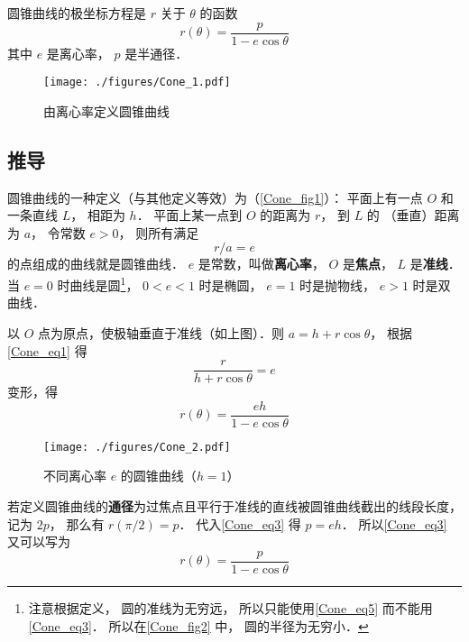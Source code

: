 

圆锥曲线的极坐标方程是 $r$ 关于 $\theta$ 的函数
\begin{equation}\label{Cone_eq5}
r(\theta)  = \frac{p}{1 - e\cos \theta }
\end{equation}
其中 $e$ 是离心率， $p$ 是半通径．

\begin{figure}[ht]
\centering
\texttt{[image: ./figures/Cone\_1.pdf]}
\caption{由离心率定义圆锥曲线}\label{Cone_fig1}
\end{figure}

\subsection{推导}
圆锥曲线的一种定义（与其他定义等效）为（\autoref{Cone_fig1}）：
平面上有一点 $O$ 和一条直线 $L$， 相距为 $h$． 
平面上某一点到 $O$ 的距离为 $r$， 到 $L$ 的
（垂直）距离为 $a$， 令常数 $e > 0$， 则所有满足
\begin{equation}\label{Cone_eq1}
r/a = e
\end{equation}
的点组成的曲线就是圆锥曲线． $e$ 是常数，叫做\textbf{离心率}， $O$ 是\textbf{焦点}， $L$ 是\textbf{准线}． 当 $e = 0$ 时曲线是圆\footnote{注意根据定义， 圆的准线为无穷远， 所以只能使用\autoref{Cone_eq5} 而不能用\autoref{Cone_eq3}． 所以在\autoref{Cone_fig2} 中， 圆的半径为无穷小．}， $0 < e < 1$ 时是椭圆， $e = 1$ 时是抛物线， $e > 1$ 时是双曲线．

以 $O$ 点为原点，使极轴垂直于准线（如上图）．则 $a = h + r \cos \theta $， 根据\autoref{Cone_eq1} 得
\begin{equation}\label{Cone_eq2}
\frac{r}{h + r \cos \theta } = e
\end{equation}
变形，得
\begin{equation}\label{Cone_eq3}
r(\theta) = \frac{eh}{1 - e\cos \theta }
\end{equation}

\begin{figure}[ht]
\centering
\texttt{[image: ./figures/Cone\_2.pdf]}
\caption{不同离心率 $e$ 的圆锥曲线（$h = 1$）} \label{Cone_fig2}
\end{figure}

若定义圆锥曲线的\textbf{通径}为过焦点且平行于准线的直线被圆锥曲线截出的线段长度，记为 $2p$， 那么有 $r(\pi /2) = p$． 代入\autoref{Cone_eq3} 得 $p = eh$． 所以\autoref{Cone_eq3} 又可以写为
\begin{equation}\label{Cone_eq4}
r(\theta)  = \frac{p}{1 - e\cos \theta }
\end{equation}



